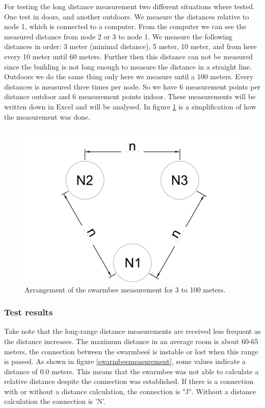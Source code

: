 \documentclass[10pt,a4paper]{article}
\begin{document}
For testing the long distance measurement two different situations where tested. One test in doors, and another outdoors. We measure the distances relative to node 1, which is connected to a computer. From the computer we can see the measured distance from node 2 or 3 to node 1. We measure the following distances in order: 3 meter (minimal distance), 5 meter, 10 meter, and from here every 10 meter until 60 meters. Further then this distance can not be measured since the building is not long enough to measure the distance in a straight line. Outdoors we do the same thing only here we measure until a 100 meters. Every distances is measured three times per node. So we have 6 measurement points per distance outdoor and 6 measurement points indoor. These measurements will be written down in Excel and will be analysed. In figure \ref{measuringarrangement} is a simplification of how the measurement was done.

\begin{figure}[H]
  \centering
      \includegraphics[width=\textwidth]{measuringarrangement}
  \caption{Arrangement of the swarmbee measurement for 3 to 100 meters.}
  \label{measuringarrangement}
\end{figure}

\subsubsection{Test results}
Take note that the long-range distance measurements are received less frequent as the distance increases. The maximum distance in an average room is about 60-65 meters, the connection between the swarmbee\'s is instable or lost when this range is passed. As shown in figure \ref{swarmbeemeasurement}, some values indicate a distance of 0.0 meters. This means that the swarmbee was not able to calculate a relative distance despite the connection was established. If there is a connection with or without a distance calculation, the connection is "J". Without a distance calculation the connection is 'N'.
\end{document}
